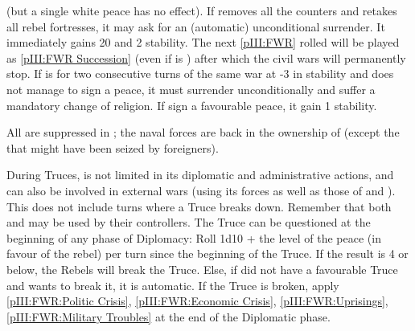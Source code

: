 \begin{digressions}
  (but a single white peace has no effect).
  \aparag If \FRA removes all the \REVOLT counters and retakes all rebel
  fortresses, it may ask for an (automatic) unconditional surrender. It
  immediately gains 20 \VP and 2 stability. The next \ref{pIII:FWR} rolled
  will be played as \ref{pIII:FWR Succession} (even if \FRA is \CATHCO) after
  which the civil wars will permanently stop.
  \aparag If \FRA is for two consecutive turns of the same war at -3 in
  stability and does not manage to sign a peace, it must surrender
  unconditionally and suffer a mandatory change of religion.
  \aparag If \FRA sign a favourable peace, it gain 1 stability.

   All \REVOLT are suppressed in \FRA; the naval
  forces are back in the ownership of \FRA (except the \DN that might have
  been seized by foreigners).

  \phdipl
  \aparag During Truces, \FRA is not limited in its diplomatic and
  administrative actions, and can also be involved in external wars (using its
  forces as well as those of \lig and \hug). This does not include turns where
  a Truce breaks down. Remember that both \lig and \hug may be used by their
  controllers.
  \aparag The Truce can be questioned at the beginning of any phase of
  Diplomacy:
  \bparag Roll 1d10 + %
  the level of the peace (in favour of the rebel)  per turn since
  the beginning of the Truce. If the result is 4 or below, the Rebels will
  break the Truce.
  \bparag Else, if \FRA did not have a favourable Truce and wants to break it,
  it is automatic.
  \bparag If the Truce is broken, apply \ref{pIII:FWR:Politic Crisis},
  \ref{pIII:FWR:Economic Crisis}, \ref{pIII:FWR:Uprisings},
  \ref{pIII:FWR:Military Troubles} at the end of the Diplomatic phase.
\end{digressions}



